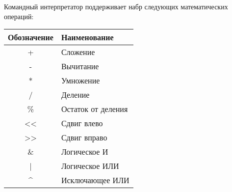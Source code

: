 Командный интерпретатор поддерживает набр следующих математических операций:

\begin{center}
	\begin{tabular}{c|l}
		\textbf{Обозначение} & \textbf{Наименование} \\
		\hline
		+ 	& 	Сложение \\
		\hline
		- 	& 	Вычитание \\
		\hline
		* 	& 	Умножение \\
		\hline
		/ 	& 	Деление \\
		\hline
		\% 	& 	Остаток от деления \\
		\hline
		<{<} 	& 	Сдвиг влево \\
		\hline
		>{>} 	& 	Сдвиг вправо \\
		\hline
		\& 	& 	Логическое И \\
		\hline
		| 	& 	Логическое ИЛИ \\
		\hline
		\textasciicircum 	& 	Исключающее ИЛИ
	\end{tabular}
\end{center}